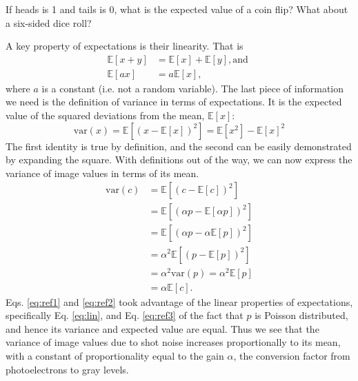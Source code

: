\documentclass[a4paper]{report}
\newcommand{\nexercise}[0]{\arabic{exercises}\addtocounter{exercises}{1}}
\begin{document}
\begin{exercisebox}[frametitle={Exercise \nexercise: Expectation example}]
If heads is 1 and tails is 0, what is the expected value of a coin flip? What about a six-sided dice roll? 
\end{exercisebox}

A key property of expectations is their linearity. That is
\begin{align}
\mathbb{E}[x+y] &= \mathbb{E}[x] + \mathbb{E}[y], \textrm{and } \\
\mathbb{E}[ax] & = a \mathbb{E}[x], \label{eq:lin}
\end{align}
where $a$ is a constant (i.e. not a random variable). The last piece of information we need is the definition of variance in terms of expectations. It is the expected value of the squared deviations from the mean, $\mathbb{E}[x]$:
\begin{equation}
	\mathrm{var}(x) = \mathbb{E}[(x - \mathbb{E}[x])^2] = \mathbb{E}[x^2] - \mathbb{E}[x]^2
\end{equation}
The first identity is true by definition, and the second can be easily demonstrated by expanding the square. With definitions out of the way, we can now express the variance of image values in terms of its mean.
\begin{align}
	\mathrm{var}(c) & = \mathbb{E}[(c - \mathbb{E}[c])^2] \\
	& = \mathbb{E}[(\alpha p - \mathbb{E}[\alpha p])^2] \\ 
	& = \mathbb{E}[(\alpha p - \alpha \mathbb{E}[p] )^2] \label{eq:ref1} \\ 
	& = \alpha^2 \mathbb{E}[(p - \mathbb{E}[p])^2] \label{eq:ref2} \\ 
	& = \alpha^2 \mathrm{var}(p) = \alpha^2 \mathbb{E}[p] \label{eq:ref3} \\
	& = \alpha\mathbb{E}[c].
\end{align}
Eqs. \ref{eq:ref1} and \ref{eq:ref2} took advantage of the linear properties of expectations, specifically Eq. \ref{eq:lin}, and Eq. \ref{eq:ref3} of the fact that $p$ is Poisson distributed, and hence its variance and expected value are equal. Thus we see that the variance of image values due to shot noise increases proportionally to its mean, with a constant of proportionality equal to the gain $\alpha$, the conversion factor from photoelectrons to gray levels.
\end{document}
